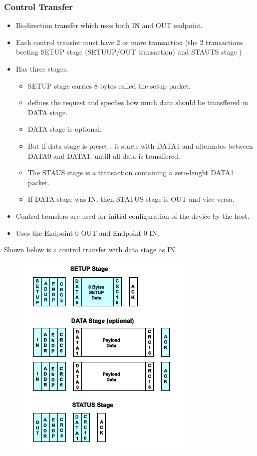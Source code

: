 \documentclass{article}
\begin{document}
\subsubsection{Control Transfer}
\begin{itemize}
    \item Bi-direction transfer which uses both IN and OUT endpoint.
    \item Each control transfer must have 2 or more transaction (the 2 transactions beeting SETUP stage (SETUUP/OUT transaction) and STAUTS stage )
    \item Has three stages.
          \begin{itemize}
              \item SETUP stage carries 8 bytes called the setup packet.
              \item defines the request and specfies how much data should be transffered in DATA stage.
              \item DATA stage is optional,
              \item But if data stage is preset , it starts with DATA1 and alternates between DATA0 and DATA1. untill all data is transffered.
              \item The STAUS stage is a transaction containing a zero-lenght DATA1 packet.
              \item If DATA  stage was IN, then STATUS stage is OUT and vice versa.
          \end{itemize}
    \item Control transfers are used for initial configuration of the device by the host.
    \item Uses the Endpoint 0 OUT and Endpoint 0 IN.
\end{itemize}

Shown below is a control transfer with data stage as IN.
\begin{figure}[H]
    \centering
    \includegraphics[]{DocuResources/ControlINtransfer.jpg}
\end{figure}
\end{document}
